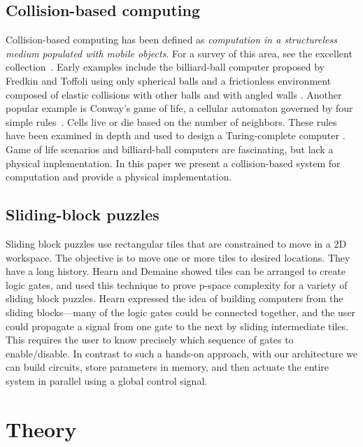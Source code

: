 \documentclass[letterpaper, 10 pt, conference]{ieeeconf}
\begin{document}
\subsection{Collision-based computing}
Collision-based computing has been defined as \emph{computation in a structureless medium populated with mobile objects}.  For a survey of this area, see the excellent collection~\cite{Adamatzky2012}. Early examples include the billiard-ball computer proposed by Fredkin and Toffoli using only spherical balls and a frictionless environment composed of elastic collisions with other balls and with angled walls \cite{Fredkin1982ConservativeLogic}. Another popular example is Conway's game of life, a cellular automaton governed by four simple rules~\cite{berlekamp2001winning}. Cells live or die based on the number of neighbors. These rules have been examined in depth and used to design a Turing-complete computer \cite{Adamatzky2002}.  Game of life scenarios and billiard-ball computers are fascinating, but lack a physical implementation.  In this paper we present a collision-based system for computation and provide a physical implementation.


\subsection{Sliding-block puzzles}
Sliding block puzzles use rectangular tiles that are constrained to move in a 2D workspace. The objective is to move one or more tiles to desired locations. They have a long history.
Hearn \cite{hearn2005complexity} and Demaine \cite{Demaine2009} showed tiles can be arranged to create logic gates, and used this technique to prove {\sc p-space} complexity for a variety of sliding block puzzles.  Hearn expressed the idea of building computers from the sliding blocks---many of the logic gates could be connected together, and the user could propagate a signal from one gate to the next by sliding intermediate tiles.  This requires the user to know precisely which sequence of gates to enable/disable.  In contrast to such a hands-on approach, with our architecture we can build circuits, store parameters in memory, and then actuate the entire system in parallel using a global control signal.

\section{Theory}\label{sec:theory}
\end{document}
